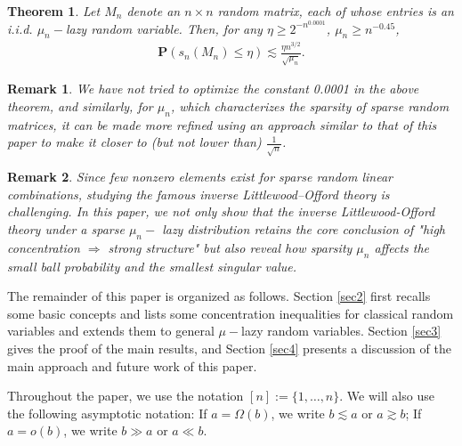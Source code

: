 \documentclass{article}
\numberwithin{equation}{section}
\theoremstyle{plain}
\newtheorem{myrem}{Remark}[section]
\newtheorem{Theorem}{Theorem}[section]
\begin{document}
\begin{Theorem}\label{main}
Let $M_n$ denote an $n \times n$ random matrix, each of whose entries is an i.i.d. $\mu_n-$lazy random variable. Then, for any $\eta \geq 2^{-n^{0.0001}}$, $\mu_n\geq n^{-0.45}$,
\begin{align*}
\textbf{P}\left(s_n\left(M_n\right) \leq \eta\right) \lesssim \frac{\eta n^{3 / 2}}{\sqrt{\mu_n}}.
\end{align*}
\end{Theorem}
\begin{myrem}
We have not tried to optimize the constant 0.0001 in the above theorem, and similarly, for $\mu_n$, which characterizes the sparsity of sparse random matrices, it can be made more refined using an approach similar to that of this paper to make it closer to (but not lower than) $\frac{1}{\sqrt{n}}$.
\end{myrem}

\begin{myrem}
Since few nonzero elements exist for sparse random linear combinations, studying the famous inverse Littlewood–Offord theory is challenging. In this paper, we not only show that the inverse Littlewood-Offord theory under a sparse $\mu_n-$ lazy distribution retains the core conclusion of "high concentration $\Rightarrow$ strong structure" but also reveal how sparsity $\mu_n$ affects the small ball probability and the smallest singular value.
\end{myrem}

The remainder of this paper is organized as follows. Section \ref{sec2} first recalls some basic concepts and lists some concentration inequalities for classical random variables and extends them to general $\mu-$lazy random variables. Section \ref{sec3} gives the proof of the main results, and Section \ref{sec4} presents a discussion of the main approach and future work of this paper.

Throughout the paper, we use the notation $[n]:= \{1, \dots, n\}$. We will also use the following asymptotic notation: If $a = \Omega(b)$, we write $b \lesssim a$ or $a \gtrsim b$; If $a = o(b)$, we write $b \gg a$ or $a \ll b$.
\end{document}
